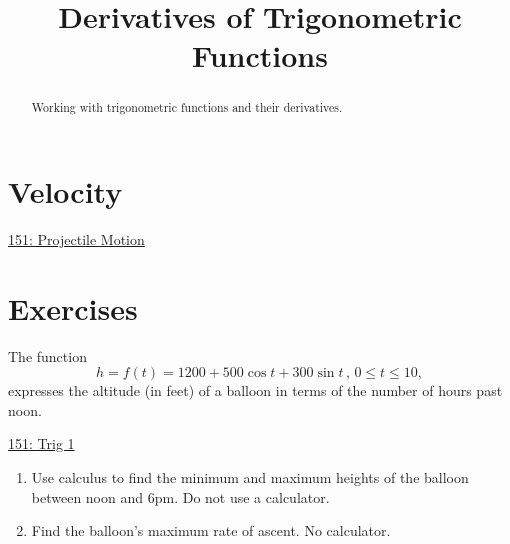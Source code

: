 \documentclass{ximera}
\title{Derivatives of Trigonometric Functions}
\begin{document}
\begin{abstract}
Working with trigonometric functions and their derivatives.
\end{abstract}
\maketitle


\section{Velocity}

\begin{onlineOnly}
    \begin{center}
\end{center}
\end{onlineOnly}

\href{https://www.desmos.com/calculator/vdtsb2fc8j}{151: Projectile Motion}



\section{Exercises}

\begin{question}  \label{Qdfethnnjjjuu}
The function
\[
    h = f(t) = 1200 + 500\cos t + 300\sin t \, , \, 0\leq t \leq 10 ,
\]
expresses the altitude (in feet) of a balloon in terms of the number of hours past noon.

\begin{onlineOnly}
    \begin{center}
\end{center}
\end{onlineOnly}

\href{https://www.desmos.com/calculator/f1ldi6yrek}{151: Trig 1}

\begin{enumerate}

\item Use calculus to find the minimum and maximum heights of the balloon between noon and 6pm. Do not use a calculator.

\item Find the balloon's maximum rate of ascent. No calculator.

\end{enumerate}

\end{question}
\end{document}
